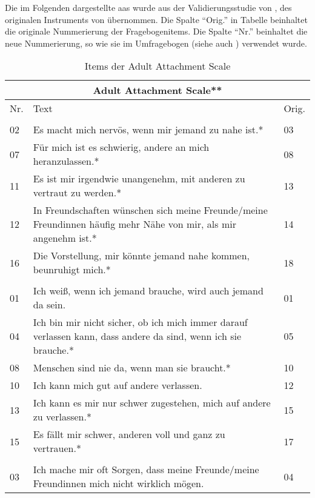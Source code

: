 
Die im Folgenden dargestellte \acrfull{aas} wurde aus der Validierungsstudie von , des originalen Instruments von  übernommen. Die Spalte \enquote{Orig.} in Tabelle  beinhaltet die originale Nummerierung der Fragebogenitems. Die Spalte \enquote{Nr.} beinhaltet die neue Nummerierung, so wie sie im Umfragebogen (siehe auch ) verwendet wurde.


\begin{table}[htbp]
\centering
\captionsetup{margin=10pt, skip=5pt}
\caption{Items der Adult Attachment Scale}
\label{table:AASItems}
\begin{tabular}{|l | m{30em} | p{2em}|} 
  \hline
  \multicolumn{3}{|c|}{\textbf{Adult Attachment Scale**}}\\
  \hline
  Nr. & Text & Orig. \\ 
  \hline\hline
  \rowcolor{lightgray}
  \multicolumn{3}{|l|}{Nähe}\\
  \hline
  02 & Es macht mich nervös, wenn mir jemand zu nahe ist.* & 03 \\
  07 & Für mich ist es schwierig, andere an mich heranzulassen.* & 08 \\
  11 & Es ist mir irgendwie unangenehm, mit anderen zu vertraut zu werden.* & 13 \\
  12 & In Freundschaften wünschen sich meine Freunde/meine Freundinnen häufig mehr Nähe von mir, als mir angenehm ist.* & 14 \\
  16 & Die Vorstellung, mir könnte jemand nahe kommen, beunruhigt mich.* & 18 \\
  \hline
  \rowcolor{lightgray} \multicolumn{3}{|l|}{Vertrauen}\\
  \hline
  01 & Ich weiß, wenn ich jemand brauche, wird auch jemand da sein. & 01 \\
  04 & Ich bin mir nicht sicher, ob ich mich immer darauf verlassen kann, dass andere da sind, wenn ich sie brauche.* & 05\\
  08 & Menschen sind nie da, wenn man sie braucht.* & 10 \\
  10 & Ich kann mich gut auf andere verlassen. & 12\\
  13 & Ich kann es mir nur schwer zugestehen, mich auf andere zu verlassen.* & 15\\
  15 & Es fällt mir schwer, anderen voll und ganz zu vertrauen.* & 17\\
  \hline
  \rowcolor{lightgray} \multicolumn{3}{|l|}{Angst}\\
  \hline
  03 & Ich mache mir oft Sorgen, dass meine Freunde/meine Freundinnen mich nicht wirklich mögen. & 04\\

\end{tabular}
\end{table}
